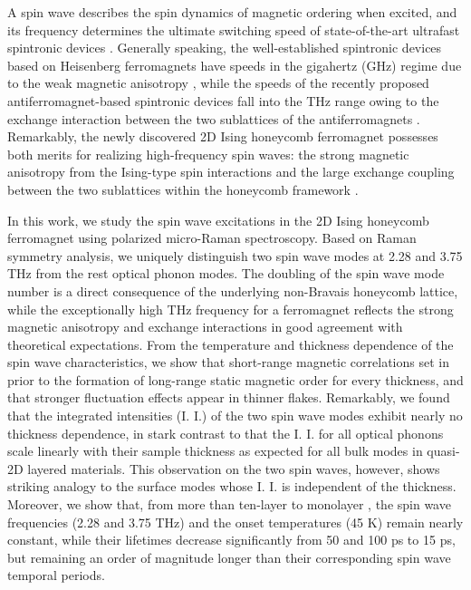 \documentclass[prl, preprint, superscriptaddress]{revtex4-1}
\begin{document}
A spin wave describes the spin dynamics of magnetic ordering when excited, and its frequency determines the ultimate switching speed of state-of-the-art ultrafast spintronic devices \cite{Chumak2015, Walowski2016, Bossini2017, Stupakiewicz2017}. Generally speaking, the well-established spintronic devices based on Heisenberg ferromagnets have speeds in the gigahertz (GHz) regime due to the weak magnetic anisotropy \cite{Koopmans2005, Kirilyuk2010}, while the speeds of the recently proposed antiferromagnet-based spintronic devices fall into the THz range owing to the exchange interaction between the two sublattices of the antiferromagnets \cite{Jungwirth2016, Baltz2018, Bossini2016}. Remarkably, the newly discovered 2D Ising honeycomb ferromagnet  possesses both merits for realizing high-frequency spin waves: the strong magnetic anisotropy from the Ising-type spin interactions \cite{McGuire2015} and the large exchange coupling between the two  sublattices within the honeycomb framework \cite{Lado2017}. 

In this work, we study the spin wave excitations in the 2D Ising honeycomb ferromagnet  using polarized micro-Raman spectroscopy. Based on Raman symmetry analysis, we uniquely distinguish two spin wave modes at 2.28 and 3.75 THz from the rest optical phonon modes. The doubling of the spin wave mode number is a direct consequence of the underlying non-Bravais honeycomb lattice, while the exceptionally high THz frequency for a ferromagnet reflects the strong magnetic anisotropy and exchange interactions in good agreement with theoretical expectations. From the temperature and thickness dependence of the spin wave characteristics, we show that short-range magnetic correlations set in prior to the formation of long-range static magnetic order for every thickness, and that stronger fluctuation effects appear in thinner flakes. Remarkably, we found that the integrated intensities (I. I.) of the two spin wave modes exhibit nearly no thickness dependence, in stark contrast to that the I. I. for all optical phonons scale linearly with their sample thickness as expected for all bulk modes in quasi-2D layered materials. This observation on the two spin waves, however, shows striking analogy to the surface modes whose I. I. is independent of the thickness. Moreover, we show that, from more than ten-layer to monolayer , the spin wave frequencies (2.28 and 3.75 THz) and the onset temperatures (45 K) remain nearly constant, while their lifetimes decrease significantly from 50 and 100 ps to 15 ps, but remaining an order of magnitude longer than their corresponding spin wave temporal periods.
\end{document}
